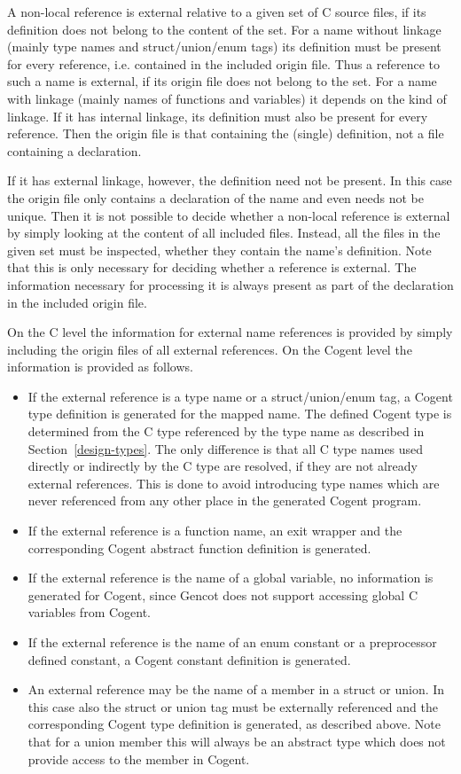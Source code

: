 A non-local reference is external relative to a given set of C source files, if its definition does not belong to the content
of the set. For a name without linkage (mainly type names and struct/union/enum tags) its definition must be present for every
reference, i.e. contained in the included origin file. Thus a reference to such a name is external, if its origin file does 
not belong to the set. For a name with linkage (mainly names of functions and variables) it depends on the kind of linkage.
If it has internal linkage, its definition must also be present for every reference. Then the origin file is that containing the
(single) definition, not a file containing a declaration. 

If it has external linkage, however, the definition need not be present. In this case the origin file only contains a declaration
of the name and even needs not be unique. Then it is not possible to decide whether a non-local reference is external by simply 
looking at the content of all included files. Instead, all the files in the given set must be inspected, whether they contain
the name's definition. Note that this is only necessary for deciding whether a reference is external. The information necessary
for processing it is always present as part of the declaration in the included origin file.

On the C level the information for external name references is provided by simply including the origin files of all external 
references. On the Cogent
level the information is provided as follows.
\begin{itemize}
\item If the external reference is a type name or a struct/union/enum tag, a Cogent type definition is generated for the mapped name.
The defined Cogent type is determined
from the C type referenced by the type name as described in Section~\ref{design-types}. The only difference is that all C type
names used directly or indirectly by the C type are resolved, if they are not already external references. This is done to avoid 
introducing type names which are never referenced from any other place in the generated Cogent program. 
\item If the external reference is a function name, an exit wrapper and the corresponding Cogent abstract function 
definition is generated.
\item If the external reference is the name of a global variable, no information is generated for Cogent, since Gencot does not
support accessing global C variables from Cogent.
\item If the external reference is the name of an enum constant or a preprocessor defined constant, a Cogent constant definition 
is generated.
\item An external reference may be the name of a member in a struct or union. In this case also the struct or union tag must
be externally referenced and the corresponding Cogent type definition is generated, as described above. Note that for a union
member this will always be an abstract type which does not provide access to the member in Cogent.
\end{itemize}
